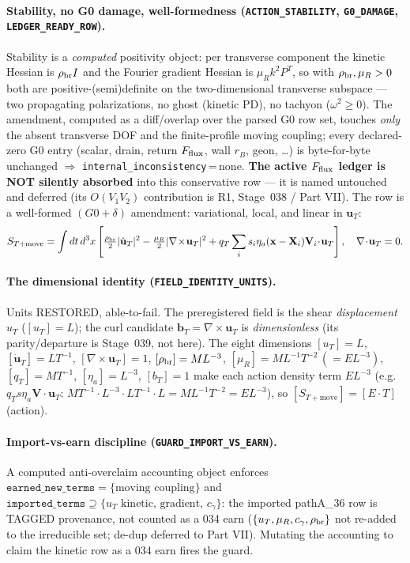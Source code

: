 \paragraph{Stability, no G0 damage, well-formedness (\texttt{ACTION\_STABILITY}, \texttt{G0\_DAMAGE}, \texttt{LEDGER\_READY\_ROW}).}
Stability is a \emph{computed} positivity object: per transverse component the
kinetic Hessian is \(\rho_{\rm br}I\) and the Fourier gradient Hessian is
\(\mu_R k^2 P^T\), so with \(\rho_{\rm br},\mu_R>0\) both are
positive-(semi)definite on the two-dimensional transverse subspace --- two
propagating polarizations, no ghost (kinetic PD), no tachyon (\(\omega^2\ge0\)). The
amendment, computed as a diff/overlap over the parsed G0 row set, touches
\emph{only} the absent transverse DOF and the finite-profile moving coupling; every
declared-zero G0 entry (scalar, drain, return \(F_{\rm flux}\), wall \(r_B\), geon,
\dots) is byte-for-byte unchanged \(\Rightarrow\)
\texttt{internal\_inconsistency}\,=\,none. \textbf{The active \(F_{\rm flux}\) ledger
is NOT silently absorbed} into this conservative row --- it is named untouched and
deferred (its \(O(V_1V_2)\) contribution is R1, Stage~038 / Part VII). The row is a
well-formed \((G0+\delta)\) amendment: variational, local, and linear in
\(\mathbf u_T\):
\[
  S_{T+\mathrm{move}}=\int dt\,d^3x\left[
    \tfrac{\rho_{\rm br}}2|\dot{\mathbf u}_T|^2
    -\tfrac{\mu_R}2|\nabla\!\times\!\mathbf u_T|^2
    +q_T\sum_i s_i\eta_a(\mathbf x-\mathbf X_i)\mathbf V_i\!\cdot\!\mathbf u_T
  \right],\quad \nabla\!\cdot\!\mathbf u_T=0.
\]

\paragraph{The dimensional identity (\texttt{FIELD\_IDENTITY\_UNITS}).}
Units RESTORED, able-to-fail. The preregistered field is the shear
\emph{displacement} \(u_T\) (\([u_T]=L\)); the curl candidate
\(\mathbf b_T=\nabla\!\times\!\mathbf u_T\) is \emph{dimensionless} (its
parity/departure is Stage~039, not here). The eight dimensions
\([u_T]=L\), \([\dot{\mathbf u}_T]=LT^{-1}\), \([\nabla\!\times\!\mathbf u_T]=1\),
\([\rho_{\rm br}]=ML^{-3}\), \([\mu_R]=ML^{-1}T^{-2}\,(=EL^{-3})\),
\([q_T]=MT^{-1}\), \([\eta_a]=L^{-3}\), \([b_T]=1\) make each action density term
\(EL^{-3}\) (e.g.\ \(q_T s\eta_a\mathbf V\!\cdot\!\mathbf u_T\):
\(MT^{-1}\cdot L^{-3}\cdot LT^{-1}\cdot L=ML^{-1}T^{-2}=EL^{-3}\)), so
\([S_{T+\mathrm{move}}]=[E\!\cdot\!T]\) (action).

\paragraph{Import-vs-earn discipline (\texttt{GUARD\_IMPORT\_VS\_EARN}).}
A computed anti-overclaim accounting object enforces
\(\texttt{earned\_new\_terms}=\{\text{moving coupling}\}\) and
\(\texttt{imported\_terms}\supseteq\{u_T\text{ kinetic},\,\text{gradient},\,c_\gamma\}\):
the imported pathA\_36 row is TAGGED provenance, not counted as a 034 earn (\(\{u_T,
\mu_R,c_\gamma,\rho_{\rm br}\}\) not re-added to the irreducible set; de-dup deferred
to Part VII). Mutating the accounting to claim the kinetic row as a 034 earn fires
the guard.

